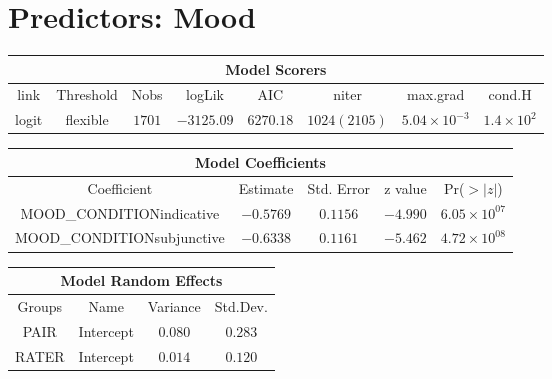\label{app:extra}
\section{Predictors: Mood}
\begin{minipage}{\linewidth}
\begin{tabular}{|c|c|c|c|c|c|c|c|}
\hline
\multicolumn{8}{|c|}{Model Scorers}\\\hline
link  &  Threshold & Nobs & logLik & AIC & niter & max.grad & cond.H\\\hline
logit & flexible & $1701$ & $-3125.09$ & $6270.18$ & $1024(2105)$ & $5.04\times 10^{-3}$ & $1.4\times 10^{2}$\\\hline
\end{tabular}
\end{minipage}
\newline
\newline
\newline
\begin{minipage}{\linewidth}
	\begin{tabular}{|c|c|c|c|c|}
	\hline
	\multicolumn{5}{|c|}{Model Coefficients}\\\hline
	Coefficient & Estimate & Std. Error & z value &Pr($>|z|$)\\\hline
	MOOD_CONDITIONindicative  & $-0.5769$ & $0.1156$ & $-4.990$ & $6.05\times10^{07}$\\\hline
	MOOD_CONDITIONsubjunctive & $-0.6338$ & $0.1161$ & $-5.462$ & $4.72\times10^{08}$\\\hline
	\end{tabular}
\end{minipage}
\newline
\newline
\newline
\begin{minipage}{\linewidth}
\begin{tabular}{|c|c|c|c|}
\hline
\multicolumn{4}{|c|}{Model Random Effects}\\\hline
Groups  &  Name       &  Variance & Std.Dev.\\\hline
PAIR  & Intercept & $0.080$   & $0.283$  \\\hline
RATER & Intercept & $0.014$   & $0.120$ \\\hline
\end{tabular}
\end{minipage}
